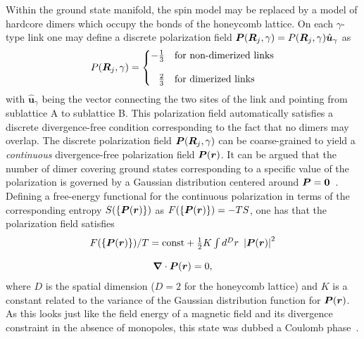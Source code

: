 Within the ground state manifold, the spin model may be replaced by a model of hardcore dimers which occupy the bonds of the honeycomb lattice.
On each $\gamma$-type link one may define a discrete polarization field $\bm{P}(\bm{R}_j, \gamma) = P(\bm{R}_j, \gamma) \hat{\bm{u}}_{\gamma}$ as
%
\begin{equation}
	P(\bR_j, \gamma) = \left\{\begin{matrix*}[l]
		-\frac{1}{3} 				& \text{for non-dimerized links} \\
		\\
		\phantom{-}\frac{2}{3}		& \text{for dimerized links}
	\end{matrix*}\right.
\end{equation}
%
with $\hat{\bm{u}}_{\gamma}$ being the vector connecting the two sites of the link and pointing from sublattice A to sublattice B.
This polarization field automatically satisfies a discrete divergence-free condition corresponding to the fact that no dimers may overlap.
The discrete polarization field $\bm{P}(\bm{R}_j, \gamma)$ can be coarse-grained to yield a \textit{continuous} divergence-free polarization field $\bm{P}(\bm{r})$.
It can be argued that the number of dimer covering ground states corresponding to a specific value of the polarization is governed by a Gaussian distribution centered around $\bm{P} = \bm{0}$~\cite{HenleyARCMP2010}.
Defining a free-energy functional for the continuous polarization in terms of the corresponding entropy $S(\{\bm{P}(\bm{r})\})$ as $F(\{\bm{P}(\bm{r})\}) = -T S$, one has that the polarization field satisfies
%
\begin{equation}
	\begin{matrix*}[c]
		F(\{\bP(\br)\})/T = {\rm const} + \frac{1}{2} K \int d^Dr~ \abs{\bP(\br)}^2 \\
		\\
		\bm{\nabla} \cdot \bP(\br) = 0,
	\end{matrix*}
\end{equation}
%
where $D$ is the spatial dimension ($D=2$ for the honeycomb lattice) and $K$ is a constant related to the variance of the Gaussian distribution function for $\bm{P}(\bm{r})$.
As this looks just like the field energy of a magnetic field and its divergence constraint in the absence of monopoles, this state was dubbed a Coulomb phase~\cite{HenleyARCMP2010}.

